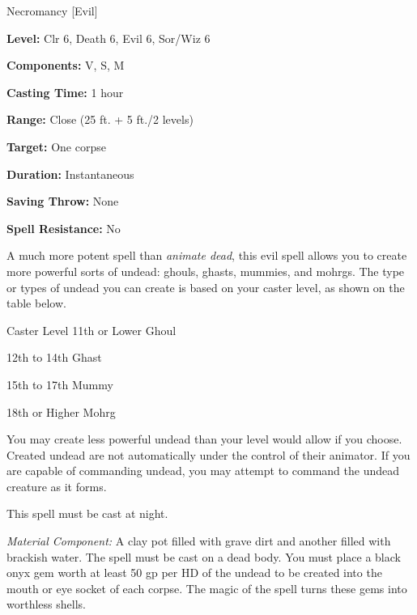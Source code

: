 
Necromancy [Evil]

\textbf{Level:} Clr 6, Death 6, Evil 6, Sor/Wiz 6

\textbf{Components:} V, S, M

\textbf{Casting Time:} 1 hour

\textbf{Range:} Close (25 ft. + 5 ft./2 levels)

\textbf{Target:} One corpse

\textbf{Duration:} Instantaneous

\textbf{Saving Throw:} None

\textbf{Spell Resistance:} No

A much more potent spell than \textit{animate dead}, this evil spell allows you 
to create more powerful sorts of undead: ghouls, ghasts, mummies, and mohrgs. The 
type or types of undead you can create is based on your caster level, as shown 
on the table below.

\begin{description*}
\item[Caster Level 11th or Lower] Ghoul
\item[12th to 14th] Ghast
\item[15th to 17th] Mummy
\item[18th or Higher] Mohrg
\end{description*}

You may create less powerful undead than your level would allow if you choose. 
Created undead are not automatically under the control of their animator. If you 
are capable of commanding undead, you may attempt to command the undead creature 
as it forms.

This spell must be cast at night.

\textit{Material Component:} A clay pot filled with grave dirt and another filled 
with brackish water. The spell must be cast on a dead body. You must place a black 
onyx gem worth at least 50 gp per HD of the undead to be created into the mouth 
or eye socket of each corpse. The magic of the spell turns these gems into worthless 
shells.

